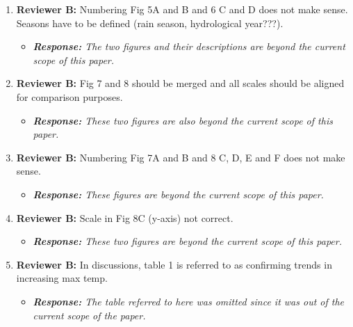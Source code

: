 \documentclass[a4paper, 12pt, conference]{ieeeconf}      %
\begin{document}
\begin{enumerate}
\begin{itemize}
  \end{itemize}
  
  \item  \textbf{Reviewer B:}  Numbering Fig 5A and B and 6 C and D does not make sense.  Seasons have to be defined (rain season, hydrological year???). 
   \begin{itemize}
  	\item \emph{\textbf{Response:} The two figures and their descriptions are beyond the current scope of this paper.}
    \end{itemize}
  
 

  \item \textbf{Reviewer B:}  Fig 7 and 8 should be merged and all scales should be aligned for comparison purposes. 
   \begin{itemize}
  	\item \emph{\textbf{Response:} These two figures are also beyond the current scope of this paper.}
    \end{itemize}
  
  

  
  \item \textbf{Reviewer B:}  Numbering Fig 7A and B and 8 C, D, E and F does not make sense. 
  \begin{itemize}
  	\item \emph{\textbf{Response:} These  figures are beyond the current scope of this paper.}
    \end{itemize}
  
  
  
  \item \textbf{Reviewer B:}  Scale in Fig 8C (y-axis) not correct.
    \begin{itemize}
  	\item \emph{\textbf{Response:} These two figures are beyond the current scope of this paper.}
    \end{itemize}
  
 
  
  \item \textbf{Reviewer B:}  In discussions, table 1 is referred to as confirming trends in increasing max temp.
   \begin{itemize}
  	\item \emph{\textbf{Response:} The table referred to here was omitted since it was out of the current scope of the paper.}
  	
  \end{itemize}
  

\end{enumerate}
\end{document}
